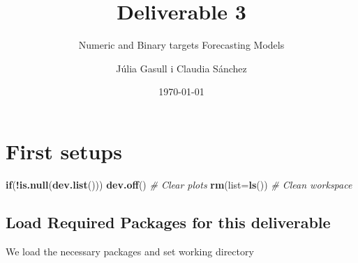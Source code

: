 \documentclass[
  18pt,
  a4paper]{article}
\title{Deliverable 3}
\subtitle{Numeric and Binary targets Forecasting Models}
\author{Júlia Gasull i Claudia Sánchez}
\date{\today}
\newenvironment{Shaded}{\begin{snugshade}}{\end{snugshade}}
\newcommand{\CommentTok}[1]{\textcolor[rgb]{0.56,0.35,0.01}{\textit{#1}}}
\newcommand{\ControlFlowTok}[1]{\textcolor[rgb]{0.13,0.29,0.53}{\textbf{#1}}}
\newcommand{\DataTypeTok}[1]{\textcolor[rgb]{0.13,0.29,0.53}{#1}}
\newcommand{\KeywordTok}[1]{\textcolor[rgb]{0.13,0.29,0.53}{\textbf{#1}}}
\newcommand{\NormalTok}[1]{#1}
\newcommand{\OperatorTok}[1]{\textcolor[rgb]{0.81,0.36,0.00}{\textbf{#1}}}
\begin{document}
\maketitle

{
\setcounter{tocdepth}{4}
\tableofcontents
}
\hypertarget{first-setups}{%
\section{First setups}\label{first-setups}}

\begin{Shaded}
\begin{Highlighting}[]
\ControlFlowTok{if}\NormalTok{(}\OperatorTok{!}\KeywordTok{is.null}\NormalTok{(}\KeywordTok{dev.list}\NormalTok{())) }\KeywordTok{dev.off}\NormalTok{()  }\CommentTok{# Clear plots}
\KeywordTok{rm}\NormalTok{(}\DataTypeTok{list=}\KeywordTok{ls}\NormalTok{())                       }\CommentTok{# Clean workspace}
\end{Highlighting}
\end{Shaded}

\hypertarget{load-required-packages-for-this-deliverable}{%
\subsection{Load Required Packages for this
deliverable}\label{load-required-packages-for-this-deliverable}}

We load the necessary packages and set working directory
\end{document}
